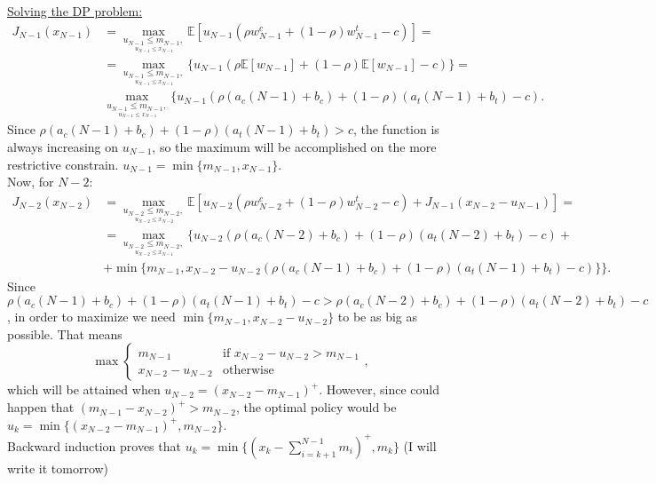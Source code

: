 \documentclass[11pt, english]{article}
\newcommand{\su}[2]{\sum\limits_{#1}^{#2}}
\begin{document}
\underline{Solving the DP problem:}\\
\begin{align}
	J_{N-1}(x_{N-1})&=\underset{\underset{\ u_{N-1}\leq x_{N-1}}{u_{N-1}\leq m_{N-1},}}{\max}\mathbb{E}[u_{N-1}(\rho w_{N-1}^c+(1-\rho)w_{N-1}^t-c)]=\\
	&=\underset{\underset{\ u_{N-1}\leq x_{N-1}}{u_{N-1}\leq m_{N-1},}}{\max}\{u_{N-1}(\rho\mathbb{E}[w_{N-1}]+(1-\rho)\mathbb{E}[w_{N-1}]-c)\}=\\
	&\underset{\underset{\ u_{N-1}\leq x_{N-1}}{u_{N-1}\leq m_{N-1},}}{\max}\{u_{N-1}(\rho(a_c(N-1)+b_c)+(1-\rho)(a_t(N-1)+b_t)-c).
\end{align}
Since $\rho(a_c(N-1)+b_c)+(1-\rho)(a_t(N-1)+b_t)>c$, the function is always increasing on $u_{N-1}$, so the maximum will be accomplished on the more restrictive constrain. $u_{N-1}=\min\{m_{N-1},x_{N-1}\}$.\\
Now, for $N-2$:\\
\begin{align}
	J_{N-2}(x_{N-2})&=\underset{\underset{\ u_{N-2}\leq x_{N-2}}{u_{N-2}\leq m_{N-2},}}{\max}\mathbb{E}[u_{N-2}(\rho w_{N-2}^c+(1-\rho)w_{N-2}^t-c)+J_{N-1}(x_{N-2}-u_{N-1})]=\\
	&=\underset{\underset{\ u_{N-2}\leq x_{N-1}}{u_{N-2}\leq m_{N-2},}}{\max}\{u_{N-2}(\rho(a_c(N-2)+b_c)+(1-\rho)(a_t(N-2)+b_t)-c)+\\
	&+\min\{m_{N-1},x_{N-2}-u_{N-2}(\rho(a_c(N-1)+b_c)+(1-\rho)(a_t(N-1)+b_t)-c)\}\}.
\end{align}
Since $\rho(a_c(N-1)+b_c)+(1-\rho)(a_t(N-1)+b_t)-c>\rho(a_c(N-2)+b_c)+(1-\rho)(a_t(N-2)+b_t)-c$, in order to maximize we need $\min\{m_{N-1},x_{N-2}-u_{N-2}\}$ to be as big as possible. That means 
$$\max\left\{\begin{array}{ll}
m_{N-1} & \text{if }x_{N-2}-u_{N-2}>m_{N-1}\\
x_{N-2}-u_{N-2} & \text{otherwise}
\end{array}\right.,$$
which will be attained when $u_{N-2}=(x_{N-2}-m_{N-1})^+$. However, since could happen that $(m_{N-1}-x_{N-2})^+>m_{N-2}$, the optimal policy would be $u_k=\min\{(x_{N-2}-m_{N-1})^+,m_{N-2}\}$.\\
Backward induction proves that $u_k=\min\{(x_{k}-\su{i=k+1}{N-1}m_i)^+,m_{k}\}$ (I will write it tomorrow)
\end{document}
